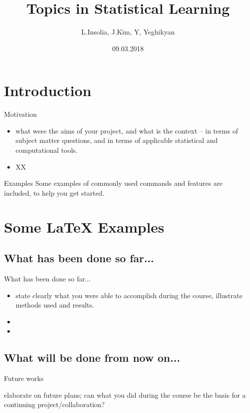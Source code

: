 \documentclass{beamer}
\title[TSL]{Topics in Statistical Learning}
\author{L.Insolia, J.Kim, Y, Yeghikyan}
\institute{Scuola Normale Superiore}
\date{09.03.2018}
\begin{document}
\begin{frame}
  \titlepage
\end{frame}


\section{Introduction}

\begin{frame}{Motivation}

\begin{itemize}
  \item what were the aims of your project, and what is the context – in terms of subject matter questions, and in terms of applicable statistical and computational tools. 
  \item XX
\end{itemize}

\vskip 1cm

\begin{block}{Examples}
Some examples of commonly used commands and features are included, to help you get started.
\end{block}

\end{frame}

\section{Some \LaTeX{} Examples}

\subsection{What has been done so far...}

\begin{frame}{What has been done so far...}

\begin{itemize}
\item state clearly what you were able to accomplish during the course, illustrate methods used and results.
\item 
\item 
\end{itemize}


\end{frame}

\subsection{What will be done from now on...}

\begin{frame}{Future works}

 elaborate on future plans; can what you did during the course be the basis for a continuing project/collaboration? 

\end{frame}
\end{document}
